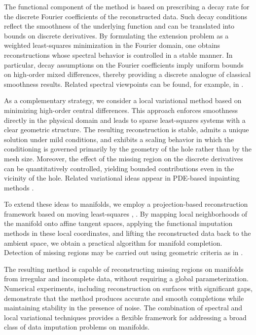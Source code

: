\documentclass[11pt,oneside,reqno]{amsart}
\theoremstyle{plain}
\numberwithin{equation}{section}
\begin{document}
The functional component of the method is based on prescribing a decay rate for the
discrete Fourier coefficients of the reconstructed data. Such decay conditions reflect
the smoothness of the underlying function and can be translated into bounds on discrete
derivatives. By formulating the extension problem as a weighted least-squares
minimization in the Fourier domain, one obtains reconstructions whose spectral behavior
is controlled in a stable manner. In particular, decay assumptions on the Fourier
coefficients imply uniform bounds on high-order mixed differences, thereby providing a
discrete analogue of classical smoothness results. Related spectral viewpoints can be
found, for example, in \cite{Trefethen2000}.

As a complementary strategy, we consider a local variational method based on minimizing
high-order central differences. This approach enforces smoothness directly in the
physical domain and leads to sparse least-squares systems with a clear geometric
structure. The resulting reconstruction is stable, admits a unique solution under mild
conditions, and exhibits a scaling behavior in which the conditioning is governed
primarily by the geometry of the hole rather than by the mesh size. Moreover, the
effect of the missing region on the discrete derivatives can be quantitatively
controlled, yielding bounded contributions even in the vicinity of the hole. Related
variational ideas appear in PDE-based inpainting methods \cite{Hoeltgen2017}.

To extend these ideas to manifolds, we employ a projection-based reconstruction
framework based on moving least-squares \cite{Meshindependent}, \cite{SoberLevin2016}. By mapping local neighborhoods of the
manifold onto affine tangent spaces, applying the functional imputation methods in
these local coordinates, and lifting the reconstructed data back to the ambient space,
we obtain a practical algorithm for manifold completion. Detection of missing regions
may be carried out using geometric criteria as in \cite{Mindthegap}.

The resulting method is capable of reconstructing missing regions on manifolds from
irregular and incomplete data, without requiring a global parameterization. Numerical
experiments, including reconstruction on surfaces with significant gaps, demonstrate
that the method produces accurate and smooth completions while maintaining stability
in the presence of noise. The combination of spectral and local variational techniques
provides a flexible framework for addressing a broad class of data imputation problems
on manifolds.
\end{document}
